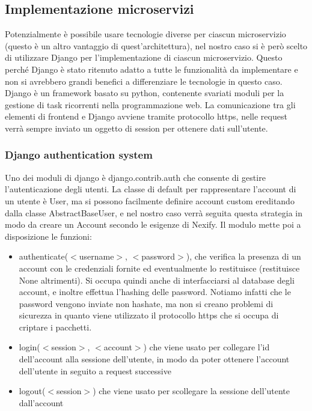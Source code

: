 \subsection{Implementazione microservizi}
Potenzialmente è possibile usare tecnologie diverse per ciascun microservizio (questo è un altro vantaggio di quest'architettura), nel nostro caso si è però scelto di utilizzare Django per l'implementazione di ciascun microservizio. Questo perché Django è stato ritenuto adatto a tutte le funzionalità da implementare e non si avrebbero grandi benefici a differenziare le tecnologie in questo caso. Django è un framework basato su python, contenente svariati moduli per la gestione di task ricorrenti nella programmazione web. La comunicazione tra gli elementi di frontend e Django avviene tramite protocollo https, nelle request verrà sempre inviato un oggetto di session per ottenere dati sull'utente.
\subsubsection{Django authentication system}
Uno dei moduli di django è django.contrib.auth che consente di gestire l'autenticazione degli utenti. La classe di default per rappresentare l'account di un utente è User, ma si possono facilmente definire account custom ereditando dalla classe AbstractBaseUser, e nel nostro caso verrà seguita questa strategia in modo da creare un Account secondo le esigenze di Nexify. Il modulo mette poi a disposizione le funzioni:
\begin{itemize}
\item authenticate($<$username$>$, $<$password$>$), che verifica la presenza di un account con le credenziali fornite ed eventualmente lo restituisce (restituisce None altrimenti). Si occupa quindi anche di interfacciarsi al database degli account, e inoltre effettua l'hashing delle password. Notiamo infatti che le password vengono inviate non hashate, ma non si creano problemi di sicurezza in quanto viene utilizzato il protocollo https che si occupa di criptare i pacchetti. 
\item login($<$session$>$, $<$account$>$) che viene usato per collegare l'id dell'account alla sessione dell'utente, in modo da poter ottenere l'account dell'utente in seguito a request successive
\item logout($<$session$>$) che viene usato per scollegare la sessione dell'utente dall'account
\end{itemize}
